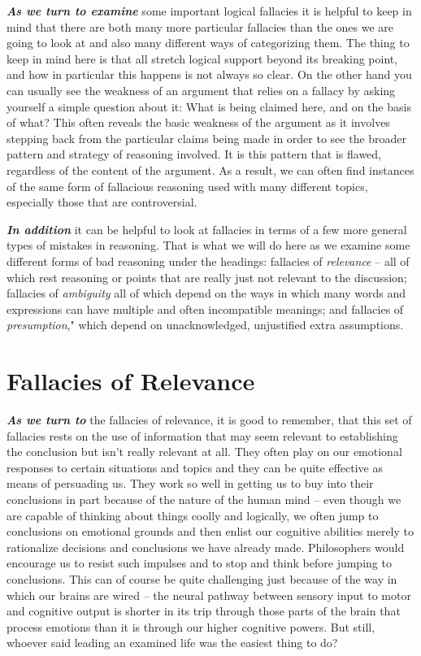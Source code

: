 \documentclass[]{book}
\begin{document}
\textbf{\emph{As we turn to examine}} some important logical fallacies it is helpful to keep in mind that there are both many more particular fallacies than the ones we are going to look at and also many different ways of categorizing them. The thing to keep in mind here is that all stretch logical support beyond its breaking point, and how in particular this happens is not always so clear. On the other hand you can usually see the weakness of an argument that relies on a fallacy by asking yourself a simple question about it: What is being claimed here, and on the basis of what? This often reveals the basic weakness of the argument as it involves stepping back from the particular claims being made in order to see the broader pattern and strategy of reasoning involved. It is this pattern that is flawed, regardless of the content of the argument. As a result, we can often find instances of the same form of fallacious reasoning used with many different topics, especially those that are controversial.

\textbf{\emph{In addition}} it can be helpful to look at fallacies in terms of a few more general types of mistakes in reasoning. That is what we will do here as we examine some different forms of bad reasoning under the headings: fallacies of \emph{relevance} -- all of which rest reasoning or points that are really just not relevant to the discussion; fallacies of \emph{ambiguity} all of which depend on the ways in which many words and expressions can have multiple and often incompatible meanings; and fallacies of \emph{presumption}," which depend on unacknowledged, unjustified extra assumptions.

\hypertarget{fallacies-of-relevance}{%
\section{Fallacies of Relevance}\label{fallacies-of-relevance}}

\textbf{\emph{As we turn to}} the fallacies of relevance, it is good to remember, that this set of fallacies rests on the use of information that may seem relevant to establishing the conclusion but isn't really relevant at all. They often play on our emotional responses to certain situations and topics and they can be quite effective as means of persuading us. They work so well in getting us to buy into their conclusions in part because of the nature of the human mind -- even though we are capable of thinking about things coolly and logically, we often jump to conclusions on emotional grounds and then enlist our cognitive abilities merely to rationalize decisions and conclusions we have already made. Philosophers would encourage us to resist such impulses and to stop and think before jumping to conclusions. This can of course be quite challenging just because of the way in which our brains are wired -- the neural pathway between sensory input to motor and cognitive output is shorter in its trip through those parts of the brain that process emotions than it is through our higher cognitive powers. But still, whoever said leading an examined life was the easiest thing to do?
\end{document}
